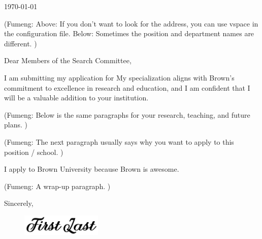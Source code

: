\documentclass{article}
\newcommand{\fy}[1]{(Fumeng: #1)}
\begin{document}
\makeheader
\makefooter


\mainfont\fontsize{9pt}{9pt}\selectfont

\linespread{1.5} 
\setlength{\parskip}{4pt}

\vspace{1.75em}

 \today
 
 \vspace{1.75em}



\vspace{2.2em}


\fy{Above: If you don't want to look for the address, you can use vspace in the configuration file. Below: Sometimes the position and department names are different. } 

Dear Members of the Search Committee,

I am submitting my application for
{}
My specialization aligns with 
Brown's commitment to excellence in research and education,
and I am confident that I will be a valuable addition to your institution.

\fy{Below is the same paragraphs for your research, teaching, and future plans. }

\lipsum[4-5]

\fy{The next paragraph usually says why you want to apply to this position / school. }

I apply to Brown University because Brown is awesome.

\fy{A wrap-up paragraph. }

\lipsum[6]













\vspace{4em}

Sincerely,
\begin{figure}[h]
	\includegraphics[height=1cm]{../fig/sign.png}
	\vspace*{-10pt}
\end{figure}

\mynamePhD
\end{document}
